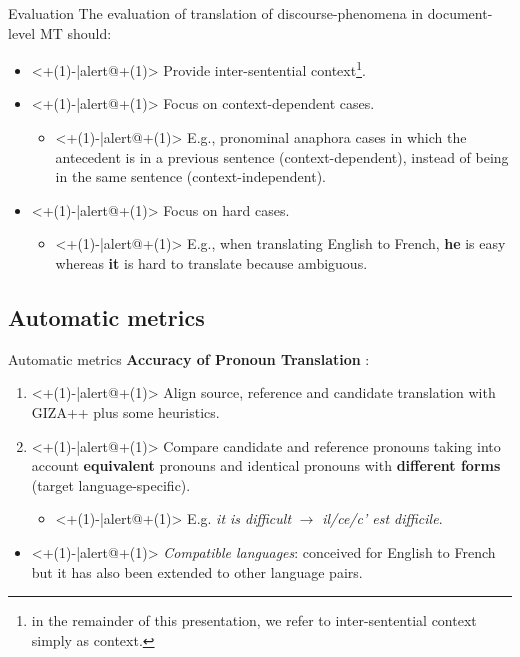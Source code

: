 \begin{frame}{Evaluation}
	The evaluation of translation of discourse-phenomena in document-level MT should:
	\begin{itemize}
		\item<+(1)-|alert@+(1)> Provide inter-sentential context\footnote{in the remainder of this presentation, we refer to inter-sentential context simply as context.}.
		\item<+(1)-|alert@+(1)> Focus on context-dependent cases.
		\begin{itemize}
			\item<+(1)-|alert@+(1)> E.g., pronominal anaphora cases in which the antecedent is in a previous sentence (context-dependent), instead of being in the same sentence (context-independent).
		\end{itemize}
		\item<+(1)-|alert@+(1)> Focus on hard cases.
			\begin{itemize}
				\item<+(1)-|alert@+(1)> E.g., when translating English to French, \textbf{he} is easy whereas \textbf{it} is hard to translate because ambiguous.
			\end{itemize}
	\end{itemize} 
\end{frame}


\subsection{Automatic metrics}

\begin{frame}{Automatic metrics}
	\textbf{Accuracy of Pronoun Translation} \cite{miculicich_werlen_validation_2017}:
	\begin{enumerate}
		\item<+(1)-|alert@+(1)> Align source, reference and candidate translation with GIZA++ plus some heuristics.
		\item<+(1)-|alert@+(1)> Compare candidate and reference pronouns taking into account \textbf{equivalent} pronouns and identical pronouns with \textbf{different forms} (target language-specific).
		\begin{itemize}
			\item<+(1)-|alert@+(1)> E.g. \textit{it is difficult} $\rightarrow$ \textit{il/ce/c' est difficile}. 
		\end{itemize}
	\end{enumerate}
	\begin{itemize}
		\item<+(1)-|alert@+(1)> \textit{Compatible languages}: conceived for English to French but it has also been extended to other language pairs. \\
	\end{itemize}
\end{frame}

